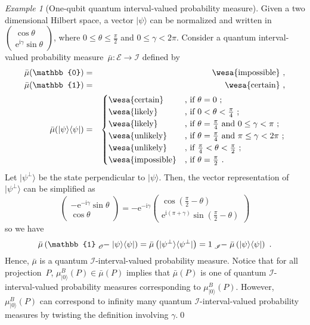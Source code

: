 \documentclass{article}
\theoremstyle{remark}
\newtheorem{example}{Example}
\newcommand{\events}{\ensuremath{\mathcal{E}}}
\newcommand{\ket}[1]{|#1\rangle}
\newcommand{\proj}[1]{|#1 \rangle\langle #1 |}
\newcommand{\imposs}{{\mbox{\wesa{impossible}}}}
\newcommand{\likely}{{\mbox{\wesa{likely}}}}
\newcommand{\unlikely}{{\mbox{\wesa{unlikely}}}}
\newcommand{\necess}{{\mbox{\wesa{certain}}}}
\newcommand{\rme}{\mathrm{e}}
\newcommand{\rmi}{\mathrm{i}}
\begin{document}
\begin{example}[One-qubit quantum interval-valued probability measure]
Given a two dimensional Hilbert space, a vector $\ket{\psi}$ can
be normalized and written in $\left(\begin{array}{c}
\cos\theta\\
\rme^{\rmi\gamma}\sin\theta
\end{array}\right)$, where $0\le\theta\le\frac{\pi}{2}$ and $0\le\gamma<2\pi$. Consider
a quantum interval-valued probability measure~$\bar{\mu}:\events\rightarrow\mathscr{I}$
defined by 
\begin{eqnarray*}
\bar{\mu}(\mathbb{0}) & = & \imposs\textrm{ ,}\\
\bar{\mu}(\mathbb{1}) & = & \necess\textrm{ ,}\\
\bar{\mu}(\proj{\psi}) & = & \begin{cases}
\necess & \textrm{, if }\theta=0\textrm{ ;}\\
\likely & \textrm{, if }0<\theta<\frac{\pi}{4}\textrm{ ;}\\
\likely & \textrm{, if }\theta=\frac{\pi}{4}\textrm{ and }0\le\gamma<\pi\textrm{ ;}\\
\unlikely & \textrm{, if }\theta=\frac{\pi}{4}\textrm{ and }\pi\le\gamma<2\pi\textrm{ ;}\\
\unlikely & \textrm{, if }\frac{\pi}{4}<\theta<\frac{\pi}{2}\textrm{ ;}\\
\imposs & \textrm{, if }\theta=\frac{\pi}{2}\textrm{ .}
\end{cases}
\end{eqnarray*}
Let $\ket{\psi^{\perp}}$ be the state perpendicular to $\ket{\psi}$.
Then, the vector representation of $\ket{\psi^{\perp}}$ can be simplified
as 
\[
\left(\begin{array}{c}
-\rme^{-\rmi\gamma}\sin\theta\\
\cos\theta
\end{array}\right)=-\rme^{-\rmi\gamma}\left(\begin{array}{c}
\cos\left(\frac{\pi}{2}-\theta\right)\\
\rme^{\rmi\left(\pi+\gamma\right)}\sin\left(\frac{\pi}{2}-\theta\right)
\end{array}\right)
\]
so we have 
\[
\bar{\mu}\left(\mathbb{1}\tensor*[_{\mathscr{O}}]{-}{}\proj{\psi}\right)=\bar{\mu}\left(\proj{\psi^{\perp}}\right)=1\tensor*[_{\mathscr{I}}]{-}{}\bar{\mu}\left(\proj{\psi}\right)\textrm{ .}
\]
Hence, $\bar{\mu}$ is a quantum $\mathscr{I}$-interval-valued probability
measure. Notice that for all projection~$P$, $\mu_{\ket{0}}^{B}(P)\in\bar{\mu}(P)$
implies that $\bar{\mu}(P)$ is one of quantum $\mathscr{I}$-interval-valued
probability measures corresponding to $\mu_{\ket{0}}^{B}(P)$. However,
$\mu_{\ket{0}}^{B}(P)$ can correspond to infinity many quantum $\mathscr{I}$-interval-valued
probability measures by twisting the definition involving $\gamma$.\qed\end{example}
\end{document}
